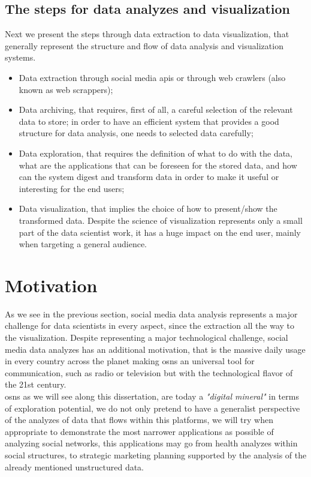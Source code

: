 \subsection*{The steps for data analyzes and visualization}

Next we present the steps through data extraction to data visualization, that generally represent the structure and flow of data analysis and visualization systems.

\begin{itemize}
\item Data extraction through social media \glspl{api} or through web crawlers (also known as web scrappers);
\item Data archiving, that requires, first of all, a careful selection of the relevant data to store; in order to have an efficient system that provides a good structure for data analysis, one needs
to selected data carefully;
\item Data exploration, that requires the definition of what to do with the data, what are the applications that can be foreseen for the stored data, and how can the system digest and transform data in order to make it useful or interesting for the end users;
\item Data visualization, that implies the choice of how to present/show the transformed data. Despite the science of visualization represents only a small part of the data scientist work, it has a huge impact on the end user, mainly when targeting a general audience.
\end{itemize}

\section{Motivation}
As we see in the previous section, social media data analysis represents a major challenge for data scientists in every aspect, since the extraction all the way to the visualization. Despite representing a major technological challenge, social media data analyzes has an additional motivation, that is the massive daily usage in every country across the planet making \glspl{osn} an universal tool for communication, such as radio or television but with the technological flavor of the 21st century.\\
\indent \glspl{osn} as we will see along this dissertation, are today a \textit{"digital mineral"} in terms of exploration potential, we do not only pretend to have a generalist perspective of the analyzes of data that flows within this platforms, we will try when appropriate to demonstrate the most narrower applications as possible of analyzing social networks, this applications may go from health analyzes within social structures, to strategic marketing planning supported by the analysis of the already mentioned unstructured data.

